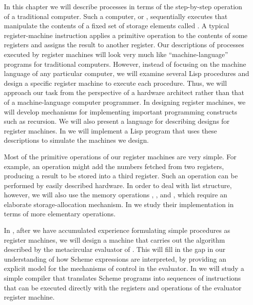 In this chapter we will describe processes in terms of the step-by-step operation of a traditional computer.
Such a computer, or , sequentially executes  that manipulate the contents of a fixed set of storage elements called .
A typical register-machine instruction applies a primitive operation to the contents of some registers and assigns the result to another register.
Our descriptions of processes executed by register machines will look very much like “machine-language” programs for traditional computers.
However, instead of focusing on the machine language of any particular computer, we will examine several Lisp procedures and design a specific register machine to execute each procedure.
Thus, we will approach our task from the perspective of a hardware architect rather than that of a machine-language computer programmer.
In designing register machines, we will develop mechanisms for implementing important programming constructs such as recursion.
We will also present a language for describing designs for register machines.
In  we will implement a Lisp program that uses these descriptions to simulate the machines we design.

Most of the primitive operations of our register machines are very simple.
For example, an operation might add the numbers fetched from two registers, producing a result to be stored into a third register.
Such an operation can be performed by easily described hardware.
In order to deal with list structure, however, we will also use the memory operations , , and , which require an elaborate storage-allocation mechanism.
In  we study their implementation in terms of more elementary operations.

In , after we have accumulated experience formulating simple procedures as register machines, we will design a machine that carries out the algorithm described by the metacircular evaluator of .
This will fill in the gap in our understanding of how Scheme expressions are interpreted, by providing an explicit model for the mechanisms of control in the evaluator.
In  we will study a simple compiler that translates Scheme programs into sequences of instructions that can be executed directly with the registers and operations of the evaluator register machine.








